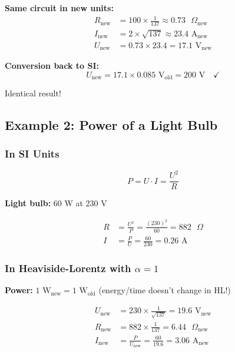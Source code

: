 	\textbf{Same circuit in new units:}
	\begin{align}
		R_{\text{new}} &= 100 \times \frac{1}{137} \approx 0.73 \text{ }\Omega_{\text{new}} \\
		I_{\text{new}} &= 2 \times \sqrt{137} \approx 23.4 \text{ A}_{\text{new}} \\
		U_{\text{new}} &= 0.73 \times 23.4 = 17.1 \text{ V}_{\text{new}}
	\end{align}
	
	\textbf{Conversion back to SI:}
	\begin{equation}
		U_{\text{new}} = 17.1 \times 0.085 \text{ V}_{\text{old}} = 200 \text{ V} \quad \checkmark
	\end{equation}
	
	Identical result!
	
	\subsection{Example 2: Power of a Light Bulb}
	
	\subsubsection{In SI Units}
	
	\begin{equation}
		P = U \cdot I = \frac{U^2}{R}
	\end{equation}
	
	\textbf{Light bulb:} 60 W at 230 V
	
	\begin{align}
		R &= \frac{U^2}{P} = \frac{(230)^2}{60} = 882 \text{ }\Omega \\
		I &= \frac{P}{U} = \frac{60}{230} = 0.26 \text{ A}
	\end{align}
	
	\subsubsection{In Heaviside-Lorentz with $\alpha = 1$}
	
	\textbf{Power:} $1 \text{ W}_{\text{new}} = 1 \text{ W}_{\text{old}}$ (energy/time doesn't change in HL!)
	
	\begin{align}
		U_{\text{new}} &= 230 \times \frac{1}{\sqrt{137}} = 19.6 \text{ V}_{\text{new}} \\
		R_{\text{new}} &= 882 \times \frac{1}{137} = 6.44 \text{ }\Omega_{\text{new}} \\
		I_{\text{new}} &= \frac{P}{U_{\text{new}}} = \frac{60}{19.6} = 3.06 \text{ A}_{\text{new}}
	\end{align}
	
